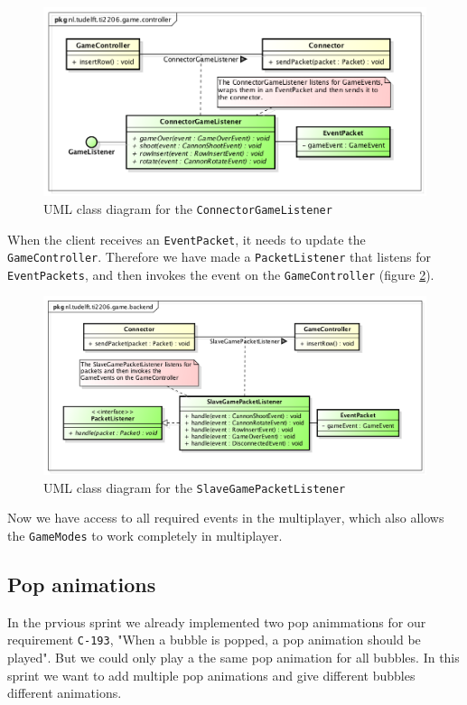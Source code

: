 \documentclass[a4paper]{article}
\begin{document}
\begin{figure}[H]
	\centering
	\includegraphics[scale=0.5]{ConnectorGameListenerExtended.png}
    \caption{UML class diagram for the \texttt{ConnectorGameListener} }
    \label{fig:connectorgamelistener}
\end{figure}

When the client receives an \texttt{EventPacket}, it needs to update the \texttt{GameController}. Therefore we have made a \texttt{PacketListener} that listens for \texttt{EventPackets}, and then invokes the event on the \texttt{GameController} (figure \ref{fig:slavegamepacketlistener}).

\begin{figure}[H]
	\centering
	\includegraphics[scale=0.5]{SlaveGamePacketListener.png}
    \caption{UML class diagram for the \texttt{SlaveGamePacketListener} }
    \label{fig:slavegamepacketlistener}
\end{figure}

Now we have access to all required events in the multiplayer, which also allows the \texttt{GameModes} to work completely in multiplayer.


\subsection{Pop animations}
In the prvious sprint we already implemented two pop animmations for our requirement \texttt{C-193}, "When a bubble is popped, a pop animation should be played". But we could only play a the same pop animation for all bubbles. In this sprint we want to add multiple pop animations and give different bubbles different animations.
\end{document}
